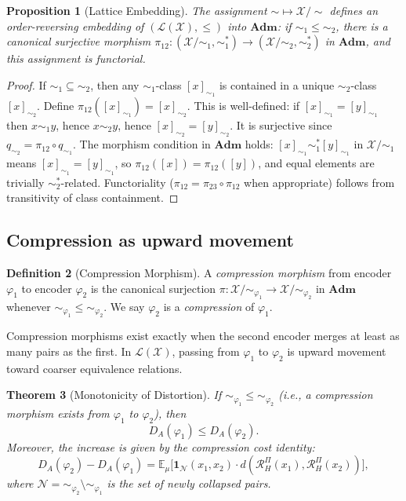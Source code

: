 \documentclass[11pt, a4paper]{article}
\theoremstyle{plain}
\newtheorem{theorem}{Theorem}[section]
\newtheorem{proposition}[theorem]{Proposition}
\theoremstyle{definition}
\newtheorem{definition}[theorem]{Definition}
\theoremstyle{remark}
\newcommand{\E}{\mathbb{E}}
\newcommand{\calX}{\mathcal{X}}
\newcommand{\calL}{\mathcal{L}}
\newcommand{\RHP}{\mathcal{R}_{H}^{\Pi}}
\newcommand{\Adm}{\mathbf{Adm}}
\begin{document}
\begin{proposition}[Lattice Embedding]
\label{prop:lattice}
The assignment ${\sim} \mapsto \calX/{\sim}$ defines an order-reversing
embedding of $(\calL(\calX), \leq)$ into $\Adm$: if ${\sim_1} \leq {\sim_2}$,
there is a canonical surjective morphism $\pi_{12}\colon (\calX/{\sim_1},
\sim_1^*) \to (\calX/{\sim_2}, \sim_2^*)$ in $\Adm$, and this assignment is
functorial.
\end{proposition}

\begin{proof}
If ${\sim_1} \subseteq {\sim_2}$, then any $\sim_1$-class $[x]_{\sim_1}$
is contained in a unique $\sim_2$-class $[x]_{\sim_2}$. Define
$\pi_{12}([x]_{\sim_1}) = [x]_{\sim_2}$. This is well-defined: if
$[x]_{\sim_1} = [y]_{\sim_1}$ then $x \sim_1 y$, hence $x \sim_2 y$, hence
$[x]_{\sim_2} = [y]_{\sim_2}$. It is surjective since $q_{\sim_2} = \pi_{12}
\circ q_{\sim_1}$. The morphism condition in $\Adm$ holds: $[x]_{\sim_1}
\sim_1^* [y]_{\sim_1}$ in $\calX/{\sim_1}$ means $[x]_{\sim_1} =
[y]_{\sim_1}$, so $\pi_{12}([x]) = \pi_{12}([y])$, and equal elements are
trivially $\sim_2^*$-related. Functoriality ($\pi_{12} = \pi_{23} \circ
\pi_{12}$ when appropriate) follows from transitivity of class containment.
\end{proof}

\subsection{Compression as upward movement}

\begin{definition}[Compression Morphism]
\label{def:compression}
A \emph{compression morphism} from encoder $\varphi_1$ to encoder $\varphi_2$
is the canonical surjection $\pi\colon \calX/{\sim_{\varphi_1}} \to
\calX/{\sim_{\varphi_2}}$ in $\Adm$ whenever ${\sim_{\varphi_1}} \leq
{\sim_{\varphi_2}}$. We say $\varphi_2$ is a \emph{compression} of $\varphi_1$.
\end{definition}

Compression morphisms exist exactly when the second encoder merges at least
as many pairs as the first. In $\calL(\calX)$, passing from $\varphi_1$ to
$\varphi_2$ is upward movement toward coarser equivalence relations.

\begin{theorem}[Monotonicity of Distortion]
\label{thm:monotone}
If ${\sim_{\varphi_1}} \leq {\sim_{\varphi_2}}$ (i.e., a compression morphism
exists from $\varphi_1$ to $\varphi_2$), then
\[
  D_A(\varphi_1) \leq D_A(\varphi_2).
\]
Moreover, the increase is given by the \emph{compression cost identity}:
\[
  D_A(\varphi_2) - D_A(\varphi_1)
  = \E_\mu\!\bigl[\mathbf{1}_\mathcal{N}(x_1,x_2)
    \cdot d(\RHP(x_1), \RHP(x_2))\bigr],
\]
where $\mathcal{N} = {\sim_{\varphi_2}} \setminus {\sim_{\varphi_1}}$
is the set of newly collapsed pairs.
\end{theorem}
\end{document}
